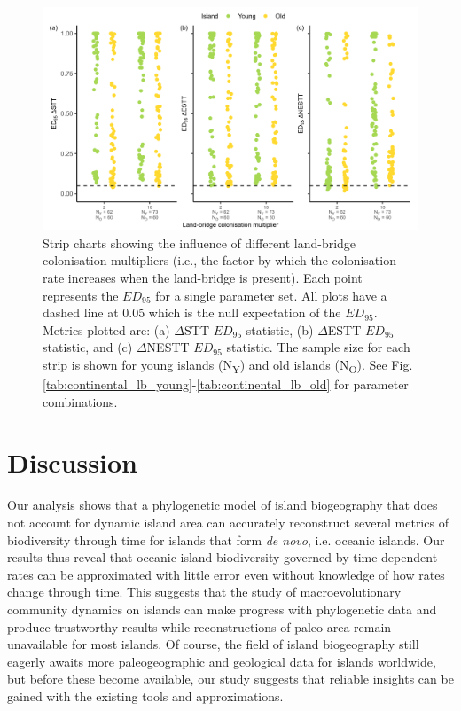 \documentclass{article}
\begin{document}
\begin{figure}
    \centering
    \includegraphics[width=\textwidth]{JBI-21-0508_Fig7.png}
    \caption{Strip charts showing the influence of different land-bridge colonisation multipliers (i.e., the factor by which the colonisation rate increases when the land-bridge is present). Each point represents the $ED_{95}$ for a single parameter set. All plots have a dashed line at 0.05 which is the null expectation of the $ED_{95}$. Metrics plotted are: (a) $\Delta$STT $ED_{95}$ statistic, (b) $\Delta$ESTT $ED_{95}$ statistic, and (c) $\Delta$NESTT $ED_{95}$ statistic. The sample size for each strip is shown for young islands (N\textsubscript{Y}) and old islands (N\textsubscript{O}). See Fig. \ref{tab:continental_lb_young}-\ref{tab:continental_lb_old} for parameter combinations.}
    \label{fig:Land-bridge colonisation multiplier_spec_nltt}
\end{figure}

\clearpage

\section*{Discussion}

Our analysis shows that a phylogenetic model of island biogeography that does not account for dynamic island area can accurately reconstruct several metrics of biodiversity through time for islands that form \textit{de novo}, i.e. oceanic islands. Our results thus reveal that oceanic island biodiversity governed by time-dependent rates can be approximated with little error even without knowledge of how rates change through time. This suggests that the study of macroevolutionary community dynamics on islands can make progress with phylogenetic data and produce trustworthy results while reconstructions of paleo-area remain unavailable for most islands. Of course, the field of island biogeography still eagerly awaits more paleogeographic and geological data for islands worldwide, but before these become available, our study suggests that reliable insights can be gained with the existing tools and approximations. \\
\end{document}
